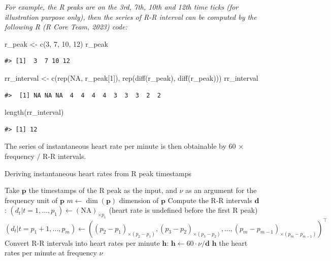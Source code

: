 \documentclass[
]{article}
\newenvironment{Shaded}{\begin{snugshade}}{\end{snugshade}}
\newcommand{\ConstantTok}[1]{\textcolor[rgb]{0.00,0.00,0.00}{#1}}
\newcommand{\DecValTok}[1]{\textcolor[rgb]{0.00,0.00,0.81}{#1}}
\newcommand{\FunctionTok}[1]{\textcolor[rgb]{0.00,0.00,0.00}{#1}}
\newcommand{\NormalTok}[1]{#1}
\newcommand{\OtherTok}[1]{\textcolor[rgb]{0.56,0.35,0.01}{#1}}
\begin{document}
\emph{For example, the R peaks are on the 3rd, 7th, 10th and 12th time
ticks (for illustration purpose only), then the series of R-R interval
can be computed by the following R (R Core Team, 2023) code:}

\begin{Shaded}
\begin{Highlighting}[]
\NormalTok{r\_peak }\OtherTok{\textless{}{-}} \FunctionTok{c}\NormalTok{(}\DecValTok{3}\NormalTok{, }\DecValTok{7}\NormalTok{, }\DecValTok{10}\NormalTok{, }\DecValTok{12}\NormalTok{)}
\NormalTok{r\_peak}
\end{Highlighting}
\end{Shaded}

\begin{verbatim}
#> [1]  3  7 10 12
\end{verbatim}

\begin{Shaded}
\begin{Highlighting}[]
\NormalTok{rr\_interval }\OtherTok{\textless{}{-}} \FunctionTok{c}\NormalTok{(}\FunctionTok{rep}\NormalTok{(}\ConstantTok{NA}\NormalTok{, r\_peak[}\DecValTok{1}\NormalTok{]), }\FunctionTok{rep}\NormalTok{(}\FunctionTok{diff}\NormalTok{(r\_peak), }\FunctionTok{diff}\NormalTok{(r\_peak)))}
\NormalTok{rr\_interval}
\end{Highlighting}
\end{Shaded}

\begin{verbatim}
#>  [1] NA NA NA  4  4  4  4  3  3  3  2  2
\end{verbatim}

\begin{Shaded}
\begin{Highlighting}[]
\FunctionTok{length}\NormalTok{(rr\_interval)}
\end{Highlighting}
\end{Shaded}

\begin{verbatim}
#> [1] 12
\end{verbatim}

The series of instantaneous heart rate per minute is then obtainable by
60 \(\times\) frequency \(/\) R-R intervals.

\begin{algorithm}
\caption{Deriving instantaneous heart rates from R peak timestamps}
\begin{algorithmic}[1]
\STATE Take $\mathbf{p}$ the timestamps of the R peak as the input, and $\nu$ as an argument for the frequency unit of $\mathbf{p}$
\STATE $m \leftarrow \dim(\mathbf{p})$ dimension of $\mathbf{p}$
\STATE Compute the R-R intervals $\mathbf{d}$:
\STATE $(d_t | t = 1, ..., p_1) \leftarrow (\text{NA})_{\times p_1}$ (heart rate is undefined before the first R peak)
\STATE $(d_t | t = p_1 + 1, ..., p_{m}) \leftarrow ((p_2 - p_1)_{\times (p_2 - p_1)}, (p_3 - p_2)_{\times (p_3 - p_2)}, ..., (p_{m} - p_{m - 1})_{\times (p_{m} - p_{m - 1})})^\top$
\STATE Convert R-R intervals into heart rates per minute $\mathbf{h}$:
\STATE $\mathbf{h} \leftarrow 60 \cdot \nu / \mathbf{d}$
\RETURN $\mathbf{h}$ the heart rates per minute at frequency $\nu$
\end{algorithmic}
\end{algorithm}
\end{document}
